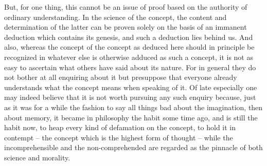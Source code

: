 But, for one thing, this cannot be an issue
of proof based on the authority of ordinary understanding. In the science
of the concept, the content and determination of the latter can be proven
solely on the basis of an immanent deduction which contains its genesis,
and such a deduction lies behind us. And also, whereas the concept of the
concept as deduced here should in principle be recognized in whatever else
is otherwise adduced as such a concept, it is not as easy to ascertain what
others have said about its nature. For in general they do not bother at all
enquiring about it but presuppose that everyone already understands what
the concept means when speaking of it. Of late especially one may indeed
believe that it is not worth pursuing any such enquiry because, just as it
was for a while the fashion to say all things bad about the imagination,
then about memory, it became in philosophy the habit some time ago, and
is still the habit now, to heap every kind of defamation on the concept, to
hold it in contempt – the concept which is the highest form of thought –
while the incomprehensible and the non-comprehended are regarded as the
pinnacle of both science and morality.


